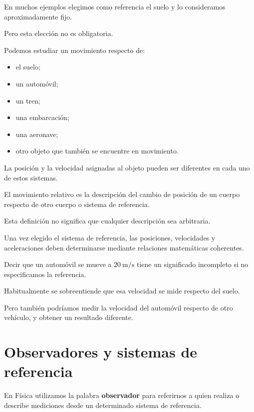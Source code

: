 En muchos ejemplos elegimos como referencia el suelo y lo
consideramos aproximadamente fijo.

Pero esta elección no es obligatoria.

Podemos estudiar un movimiento respecto de:

\begin{itemize}
    \item el suelo;
    \item un automóvil;
    \item un tren;
    \item una embarcación;
    \item una aeronave;
    \item otro objeto que también se encuentre en movimiento.
\end{itemize}

La posición y la velocidad asignadas al objeto pueden ser diferentes
en cada uno de estos sistemas.

\begin{definicion}

El movimiento relativo es la descripción del cambio de posición de
un cuerpo respecto de otro cuerpo o sistema de referencia.

\end{definicion}

Esta definición no significa que cualquier descripción sea
arbitraria.

Una vez elegido el sistema de referencia, las posiciones,
velocidades y aceleraciones deben determinarse mediante relaciones
matemáticas coherentes.

\begin{interpretacion}

Decir que un automóvil se mueve a
\(\SI{20}{\meter\per\second}\) tiene un significado incompleto
si no especificamos la referencia.

Habitualmente se sobreentiende que esa velocidad se mide respecto
del suelo.

Pero también podríamos medir la velocidad del automóvil respecto
de otro vehículo, y obtener un resultado diferente.

\end{interpretacion}


\section{Observadores y sistemas de referencia}

En Física utilizamos la palabra \textbf{observador} para referirnos
a quien realiza o describe mediciones desde un determinado sistema
de referencia.

